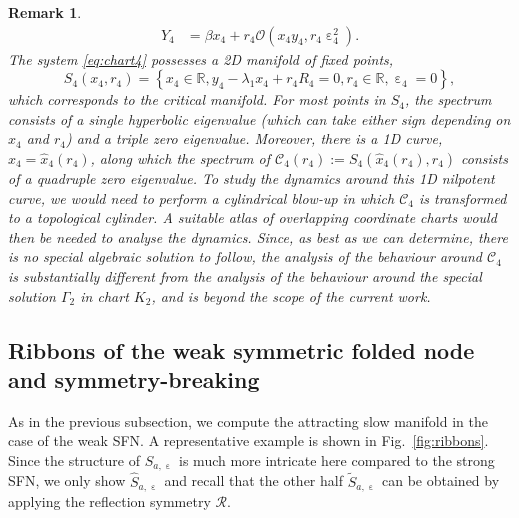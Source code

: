 \documentclass[10pt,onecolumn]{article}
\theoremstyle{plain}
\newtheorem{remark}{Remark}[section]
\DeclareMathOperator{\eps}{\varepsilon}
\begin{document}
\begin{remark}
\begin{equation*}
\begin{split}
    Y_4 &= \beta x_4 + r_4 \mathcal O \left( x_4 y_4, r_4 \eps_4^2 \right).
  \end{split}
\end{equation*}
%
The system \eqref{eq:chart4} possesses a 2D manifold of fixed points,
%
\[ S_4(x_4,r_4) = \left\{ x_4 \in \mathbb R, y_4 - \lambda_1 x_4 + r_4 R_4 =0, r_4 \in \mathbb R, \eps_4 =0 \right\}, \]
%
which corresponds to the critical manifold. For most points in $S_4$, the spectrum consists of a single hyperbolic eigenvalue (which can take either sign depending on $x_4$ and $r_4$) and a triple zero eigenvalue. Moreover, there is a 1D curve, $x_4 = \hat x_4(r_4)$, along which the spectrum of $\mathcal C_4(r_4) := S_4(\hat x_4(r_4), r_4)$ consists of a quadruple zero eigenvalue. To study the dynamics around this 1D nilpotent curve, we would need to perform a cylindrical blow-up in which $\mathcal C_4$ is transformed to a topological cylinder. A suitable atlas of overlapping coordinate charts would then be needed to analyse the dynamics. Since, as best as we can determine, there is no special algebraic solution to follow, the analysis of the behaviour around $\mathcal C_4$ is substantially different from the analysis of the behaviour around the special solution $\Gamma_2$ in chart $K_2$, and is beyond the scope of the current work. 
\end{remark}

\subsection{Ribbons of the weak symmetric folded node and symmetry-breaking}
As in the previous subsection, we compute the attracting slow manifold in the case of the weak SFN. A representative example is shown in Fig.~\ref{fig:ribbons}. Since the structure of $S_{a,\eps}$ is much more intricate here compared to the strong SFN, we only show $\widehat{S}_{a,\eps}$ and recall that the other half $\widetilde{S}_{a,\eps}$ can be obtained by applying the reflection symmetry $\mathcal R$. 
\end{document}
